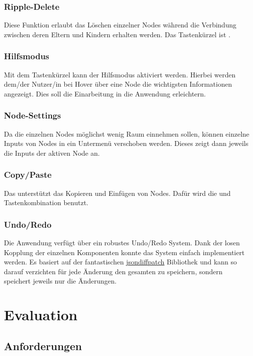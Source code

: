 \documentclass[ngerman]{article}
\begin{document}
\subsubsection{Ripple-Delete}
Diese Funktion erlaubt das Löschen einzelner Nodes während die Verbindung zwischen deren Eltern und Kindern erhalten werden. Das Tastenkürzel ist .

\subsubsection{Hilfsmodus}
Mit dem Tastenkürzel  kann der Hilfsmodus aktiviert werden. Hierbei werden dem/der Nutzer/in bei Hover über eine Node die wichtigsten Informationen angezeigt. Dies soll die Einarbeitung in die Anwendung erleichtern.

\subsubsection{Node-Settings}
Da die einzelnen Nodes möglichst wenig Raum einnehmen sollen, können einzelne Inputs von Nodes in ein Untermenü verschoben werden. Dieses zeigt dann jeweils die Inputs der aktiven Node an. 

\subsubsection{Copy/Paste}
Das  unterstützt das Kopieren und Einfügen von Nodes. Dafür wird die  und  Tastenkombination benutzt.

\subsubsection{Undo/Redo}
Die Anwendung verfügt über ein robustes Undo/Redo System. Dank der losen Kopplung der einzelnen Komponenten konnte das System einfach implementiert werden. Es basiert auf der fantastischen \hyperref[https://github.com/benjamine/jsondiffpatch]{jsondiffpatch} Bibliothek und kann so darauf verzichten für jede Änderung den gesamten  zu speichern, sondern speichert jeweils nur die Änderungen.

\pagebreak


\section{Evaluation}

\subsection{Anforderungen}
\end{document}
